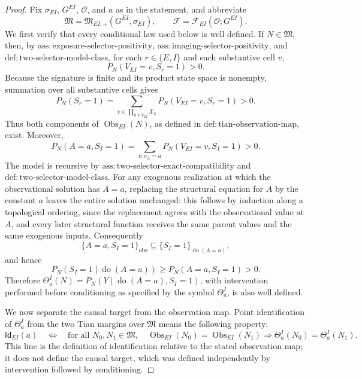 \documentclass{article}
\begin{document}
\begin{proof}
Fix \(\sigma_{EI}\), \(G^{EI}\), \(\mathcal O\), and \(a\) as in the statement, and abbreviate
\[
 \mathfrak M=\mathfrak M_{EI,+}(G^{EI},\sigma_{EI}),
 \qquad
 \mathcal F=\mathcal F_{EI}(\mathcal O;G^{EI}).
\]
We first verify that every conditional law used below is well defined.  If \(N\in\mathfrak M\), then, by \(\mathrm{ass:exposure\text{-}selector\text{-}positivity}\), \(\mathrm{ass:imaging\text{-}selector\text{-}positivity}\), and \(\mathrm{def:two\text{-}selector\text{-}model\text{-}class}\), for each \(r\in\{E,I\}\) and each substantive cell \(v\),
\[
 P_N(V_{EI}=v,S_r=1)>0.
\]
Because the signature is finite and its product state space is nonempty, summation over all substantive cells gives
\[
 P_N(S_r=1)
 =\sum_{v\in\prod_{k\in V_{EI}}\mathcal X_k}
   P_N(V_{EI}=v,S_r=1)>0.
\]
Thus both components of \(\operatorname{Obs}_{EI}(N)\), as defined in \(\mathrm{def:tian\text{-}observation\text{-}map}\), exist.  Moreover,
\[
 P_N(A=a,S_I=1)
 =\sum_{v:v_A=a}P_N(V_{EI}=v,S_I=1)>0.
\]
The model is recursive by \(\mathrm{ass:two\text{-}selector\text{-}exact\text{-}compatibility}\) and \(\mathrm{def:two\text{-}selector\text{-}model\text{-}class}\).  For any exogenous realization at which the observational solution has \(A=a\), replacing the structural equation for \(A\) by the constant \(a\) leaves the entire solution unchanged: this follows by induction along a topological ordering, since the replacement agrees with the observational value at \(A\), and every later structural function receives the same parent values and the same exogenous inputs.  Consequently
\[
 \{A=a,S_I=1\}_{\mathrm{obs}}
 \subseteq
 \{S_I=1\}_{\operatorname{do}(A=a)},
\]
and hence
\[
 P_N(S_I=1\mid\operatorname{do}(A=a))
 \ge P_N(A=a,S_I=1)>0.
\]
Therefore \(\Theta^I_a(N)=P_N(Y\mid\operatorname{do}(A=a),S_I=1)\), with intervention performed before conditioning as specified by the symbol \(\Theta^I_a\), is also well defined.

We now separate the causal target from the observation map.  Point identification of \(\Theta^I_a\) from the two Tian margins over \(\mathfrak M\) means the following property:
\[
 \mathsf{Id}_{EI}(a)
 \quad\Longleftrightarrow\quad
 \text{for all }N_0,N_1\in\mathfrak M,
 \quad
 \operatorname{Obs}_{EI}(N_0)=\operatorname{Obs}_{EI}(N_1)
 \Longrightarrow
 \Theta^I_a(N_0)=\Theta^I_a(N_1).
\]
This line is the definition of identification relative to the stated observation map; it does not define the causal target, which was defined independently by intervention followed by conditioning.


\end{proof}
\end{document}
